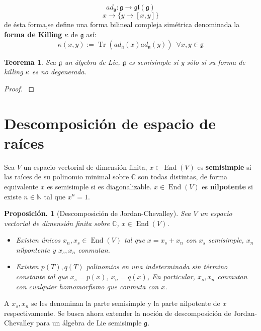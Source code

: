 \documentclass[11pt,a4paper]{article}
\newtheorem{proposition}{Proposici\'on.}
\newtheorem{theorem}{Teorema}
\newcommand{\tr}{\mathop{Tr}}
\newcommand{\End}{\mathop{End}}
\begin{document}
$$ad_{\mathfrak{g}}: \mathfrak{g} \longrightarrow \mathfrak{gl}(\mathfrak{g}) $$
$$x \longrightarrow \{ y \rightarrow [x,y] \} $$
de ésta forma,se define una forma bilineal compleja simétrica denominada la \textbf{forma de Killing} $\kappa$ de $\mathfrak{g}$ así:
$$ \kappa(x,y):=\tr \left(ad_{\mathfrak{g}}(x) ad_{\mathfrak{g}}(y) \right) \, \, \, \forall x,y \in \mathfrak{g}$$
\begin{theorem}
Sea $\mathfrak{g}$ un álgebra de Lie, $\mathfrak{g}$ es semisimple si y sólo si su forma de killing $\kappa$ es no degenerada.
\end{theorem}
\begin{proof}
\citep[Chap 3, Theorem ??]{humphreys2012introduction}
\end{proof}

\section{Descomposición de espacio de raíces}
Sea $V$ un espacio vectorial de dimensión finita, $x\in \End(V)$ es \textbf{semisimple} si las raíces de su polinomio minimal sobre $\mathbb{C}$ son todas distintas, de forma equivalente $x$ es semisimple si es diagonalizable.  $x\in \End(V)$ es \textbf{nilpotente} si existe $n\in \mathbb{N}$ tal que $x^n=1$. 
\begin{proposition}[Descomposición de Jordan-Chevalley]
Sea $V$ un espacio vectorial de  dimensión finita sobre $\mathbb{C}$, $x\in \End (V)$.
\begin{itemize}
    \item Existen únicos $x_n,x_s\in \End(V)$ tal que $x=x_s + x_n$ con $x_s$ semisimple, $x_n$ nilpontente y $x_s,x_n$ conmutan.
    \item Existen $p(T),q(T)$ polinomios en una indeterminada sin término constante tal que $x_s=p(x)$, $x_n=q(x)$, En particular, $x_s,x_n$ conmutan con cualquier homomorfismo que conmuta con $x$.
\end{itemize}
\end{proposition}
A $x_s, x_n$ se les denominan la parte semisimple y la parte nilpotente de $x$ respectivamente. Se busca ahora extender la noción de descomposición de Jordan-Chevalley para un álgebra de Lie semisimple $\mathfrak{g}$.
\end{document}
